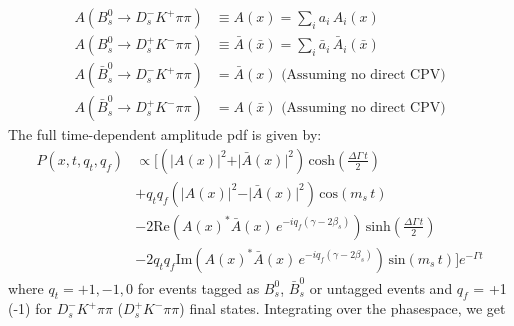 \begin{align}
	A(B_s^0 \to D_s^{-} K^{+} \pi\pi) &\equiv A(x) = \sum_i a_i \, A_i(x)   \\
	A(B_s^0 \to D_s^{+} K^{-} \pi\pi) &\equiv \bar A(\bar x) = \sum_i \bar a_i \,\bar A_i(\bar x)    \\
	A(\bar B_s^0 \to D_s^{-} K^{+} \pi\pi) &= \bar A(x)  \, \, \text{(Assuming no direct CPV)} \\
	A(\bar B_s^0 \to D_s^{+} K^{-} \pi\pi) &= A(\bar x)  \, \, \text{(Assuming no direct CPV)} 
\end{align}
The full time-dependent amplitude pdf is given by:
\begin{equation}
\begin{split}
\label{eq:PDF_full}
	P(x,t,q_t,q_f) &\propto  [
	 \left( \vert A(x) \vert^2 + \vert \bar A(x) \vert^2 \right) \, \text{cosh} \left( \frac{\Delta \Gamma \, t}{2}\right) \\
	 & + q_t q_f \left( \vert A(x) \vert^2 - \vert \bar A(x) \vert^2 \right) \, \text{cos} \left( m_s \, t \right)  \\
	 & -2 \text{Re}\left( A(x)^{*}  \bar A(x) \, e^{-i q_f (\gamma - 2\beta_s)}  \right) \, \text{sinh} \left( \frac{\Delta \Gamma \, t}{2}\right)  \\
	 & -2 q_t q_f \text{Im}\left( A(x)^{*}  \bar A(x) \, e^{-i q_f (\gamma - 2\beta_s)}  \right)\, \text{sin} \left( m_s \, t \right)  ]  e^{- \Gamma t}
\end{split}
\end{equation}
where $q_t = +1,-1,0$ for events tagged as $B_s^{0}$, $\bar B_s^{0}$ or untagged events 
and $q_f$ = +1 $ $(-1) for $D_s^{-} K^{+} \pi\pi$ ($D_s^{+} K^{-} \pi\pi$) final states. 
Integrating over the phasespace, we get
